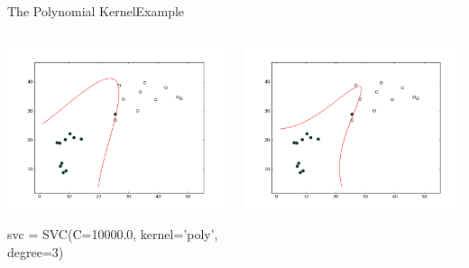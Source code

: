\documentclass[xcolor=dvipsnames]{beamer}
\begin{document}
\begin{frame}{The Polynomial Kernel}{Example}
    \begin{columns}
        \begin{column}{0.33\textwidth}
            \begin{center}
                \includegraphics[width=\textwidth]{figs/poly_d3.png}
            \end{center}
            svc = SVC(C=10000.0, kernel='poly', degree=3)
        \end{column}
        \begin{column}{0.33\textwidth}
            \begin{center}
                \includegraphics[width=\textwidth]{figs/poly_d5.png}

\end{center}
\end{column}
\end{columns}
\end{frame}
\end{document}
